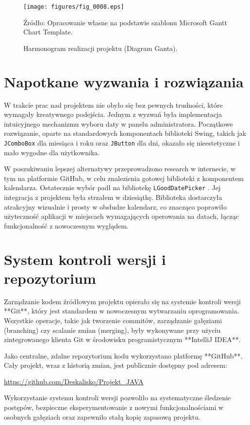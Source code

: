\begin{figure}[H]
    \centering
    \texttt{[image: figures/fig\_0008.eps]}
    \caption{Harmonogram realizacji projektu (Diagram Ganta).}
    \label{fig:gantt_chart}
    \small{Źródło: Opracowanie własne na podstawie szablonu Microsoft Gantt Chart Template.}
\end{figure}

\section{Napotkane wyzwania i rozwiązania}
W trakcie prac nad projektem nie obyło się bez pewnych trudności, które wymagały kreatywnego podejścia. Jednym z wyzwań była implementacja intuicyjnego mechanizmu wyboru daty w panelu administratora. Początkowe rozwiązanie, oparte na standardowych komponentach biblioteki Swing, takich jak \texttt{JComboBox} dla miesiąca i roku oraz \texttt{JButton} dla dni, okazało się nieestetyczne i mało wygodne dla użytkownika.

W poszukiwaniu lepszej alternatywy przeprowadzono research w internecie, w tym na platformie GitHub, w celu znalezienia gotowej biblioteki z komponentem kalendarza. Ostatecznie wybór padł na bibliotekę \texttt{LGoodDatePicker} \cite{LGoodDatePicker}. Jej integracja z projektem była strzałem w dziesiątkę. Biblioteka dostarczyła atrakcyjny wizualnie i prosty w obsłudze kalendarz, co znacząco poprawiło użyteczność aplikacji w miejscach wymagających operowania na datach, łącząc funkcjonalność z nowoczesnym wyglądem.

\section{System kontroli wersji i repozytorium}
Zarządzanie kodem źródłowym projektu opierało się na systemie kontroli wersji **Git**, który jest standardem w nowoczesnym wytwarzaniu oprogramowania. Wszystkie operacje, takie jak tworzenie commitów, zarządzanie gałęziami (branching) czy scalanie zmian (merging), były wykonywane przy użyciu zintegrowanego klienta Git w środowisku programistycznym **IntelliJ IDEA**.

Jako centralne, zdalne repozytorium kodu wykorzystano platformę **GitHub**. Cały projekt, wraz z historią zmian, jest publicznie dostępny pod adresem:
\begin{center}
    \url{https://github.com/Deskalisko/Projekt_JAVA}
\end{center}
Wykorzystanie systemu kontroli wersji pozwoliło na systematyczne śledzenie postępów, bezpieczne eksperymentowanie z nowymi funkcjonalnościami w osobnych gałęziach oraz zapewniło stałą kopię zapasową projektu.

\clearpage
